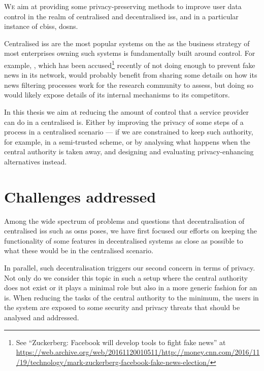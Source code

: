 

\lettrine{\textcolor[gray]{.25}{W}}{e} aim at providing some privacy-preserving 
methods to improve user data control in the realm of centralised and decentralised 
\acp{is}, and in a particular instance of \acp{cbis}, \acp{dosn}.

Centralised \acp{is} are the most popular systems on the \Internet as the business 
strategy of most enterprises owning such systems is fundamentally built around control. 
For example, \Facebook, which has been accused\footnote{See ``Zuckerberg: Facebook will develop tools to fight fake news'' at \url{https://web.archive.org/web/20161120010511/http://money.cnn.com/2016/11/19/technology/mark-zuckerberg-facebook-fake-news-election/}} 
recently of not doing enough to prevent fake news in its network, would probably 
benefit from sharing some details on how its news filtering processes work for the 
research community to assess, but doing so would likely expose details of its internal 
mechanisms to its competitors.

In this thesis we aim at reducing the amount of control that a service provider 
can do in a centralised \ac{is}. Either by improving the privacy of some steps of 
a process in a centralised scenario --- if we are constrained to keep such authority, 
for example, in a semi-trusted scheme, or by analysing what happens when the central 
authority is taken away, and designing and evaluating privacy-enhancing alternatives 
instead.

\section{Challenges addressed}
    \label{section:thesis:challenges-addressed}
Among the wide spectrum of problems and questions that decentralisation of centralised 
\acp{is} such as \acp{osn} poses, we have first focused our efforts on keeping the 
functionality of some features in decentralised systems as close as possible to 
what these would be in the centralised scenario.

In parallel, such decentralisation triggers our second concern in terms of privacy.
Not only do we consider this topic in such a setup where the central authority does 
not exist or it plays a minimal role but also in a more generic fashion for an \ac{is}. 
When reducing the tasks of the central authority to the minimum, the users in the 
system are exposed to some security and privacy threats that should be analysed 
and addressed.


